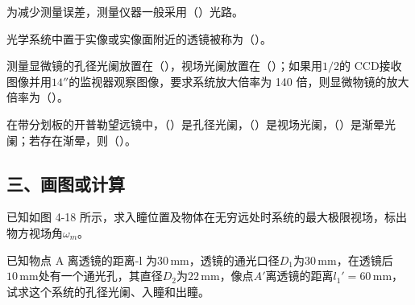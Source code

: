 \documentclass[padl, analysis, notocnum]{ExBook}
\newcommand{\answerarea}[1][3.5cm]{%
  \par\vspace{1mm}%
  \noindent{\color{themeColor!35}\rule{\linewidth}{0.4pt}}\par
  \noindent\begin{minipage}[t][#1][t]{\linewidth}\vspace{0pt}\end{minipage}\par
  \noindent{\color{themeColor!35}\rule{\linewidth}{0.4pt}}\par
}
\begin{document}
\begin{qitems}[startnum=3]
\qitem 为减少测量误差，测量仪器一般采用（\hspace{1.6em}）光路。
\label{q:80:start}
\answerarea[4.0cm]
\label{q:80:end}
\end{qitems}

\begin{qitems}[startnum=4]
\qitem 光学系统中置于实像或实像面附近的透镜被称为（\hspace{1.6em}）。
\label{q:81:start}
\answerarea[4.0cm]
\label{q:81:end}
\end{qitems}

\begin{qitems}[startnum=5]
\qitem 测量显微镜的孔径光阑放置在（\hspace{1.6em}），视场光阑放置在（\hspace{1.6em}）；如果用$1/2$的 CCD接收图像并用$14''$的监视器观察图像，要求系统放大倍率为 140 倍，则显微物镜的放大倍率为（\hspace{1.6em}）。
\label{q:82:start}
\answerarea[4.0cm]
\label{q:82:end}
\end{qitems}

\begin{qitems}[startnum=6]
\qitem 在带分划板的开普勒望远镜中，（\hspace{1.6em}）是孔径光阑，（\hspace{1.6em}）是视场光阑，（\hspace{1.6em}）是渐晕光阑；若存在渐晕，则（\hspace{1.6em}）。
\label{q:83:start}
\answerarea[4.0cm]
\label{q:83:end}
\end{qitems}

\subsection{三、画图或计算}
\begin{qitems}[startnum=1]
\qitem 已知如图 4-18 所示，求入瞳位置及物体在无穷远处时系统的最大极限视场，标出物方视场角$\omega_{m}$。
\label{q:84:start}
\answerarea[2.4cm]
\label{q:84:end}
\end{qitems}

\begin{qitems}[startnum=2]
\qitem 已知物点 A 离透镜的距离-l 为$30\,\mathrm{mm}$，透镜的通光口径$D_{1}$为$30\,\mathrm{mm}$，在透镜后$10\,\mathrm{mm}$处有一个通光孔，其直径$D_{2}$为$22\,\mathrm{mm}$，像点$A'$离透镜的距离$l_{1}'=60\,\mathrm{mm}$，试求这个系统的孔径光阑、入瞳和出瞳。
\label{q:85:start}
\answerarea[7.0cm]
\label{q:85:end}
\end{qitems}
\end{document}
